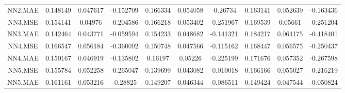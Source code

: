 \begin{longtable}[t]{cccccccccc}
NN2.MAE & 0.148149 & 0.047617 & -0.152709 & 0.166334 & 0.054058 & -0.26734 & 0.163141 & 0.052639 & -0.163436\\
\addlinespace
NN3.MSE & 0.154141 & 0.04976 & -0.204586 & 0.166218 & 0.053402 & -0.251967 & 0.169539 & 0.05661 & -0.251204\\
NN3.MAE & 0.142464 & 0.043771 & -0.059594 & 0.154233 & 0.048682 & -0.141321 & 0.184217 & 0.064175 & -0.418401\\
NN4.MSE & 0.166547 & 0.056184 & -0.360092 & 0.150748 & 0.047566 & -0.115162 & 0.168447 & 0.056575 & -0.250437\\
NN4.MAE & 0.150167 & 0.046919 & -0.135802 & 0.16197 & 0.05226 & -0.225199 & 0.171676 & 0.057352 & -0.267598\\
NN5.MSE & 0.155784 & 0.052258 & -0.265047 & 0.139699 & 0.043082 & -0.010018 & 0.166166 & 0.055027 & -0.216219\\
\addlinespace
NN5.MAE & 0.161161 & 0.053216 & -0.28825 & 0.149207 & 0.046344 & -0.086511 & 0.149424 & 0.047544 & -0.050824\\*
\end{longtable}
\endgroup{}